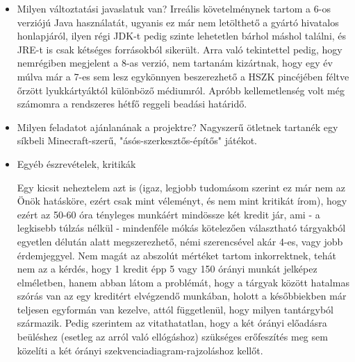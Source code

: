 \begin{itemize}
\item Milyen változtatási javaslatuk van? \newline
Irreális követelménynek tartom a 6-os verziójú Java használatát, ugyanis ez már nem letölthető a gyártó hivatalos honlapjáról, ilyen régi JDK-t pedig szinte lehetetlen bárhol máshol találni, és JRE-t is csak kétséges forrásokból sikerült. Arra való tekintettel pedig, hogy nemrégiben megjelent a 8-as verzió, nem tartanám kizártnak, hogy egy év múlva már a 7-es sem lesz egykönnyen beszerezhető a HSZK pincéjében féltve őrzött lyukkártyáktól különböző médiumról.
Apróbb kellemetlenség volt még számomra a rendszeres hétfő reggeli beadási határidő.

\item Milyen feladatot ajánlanának a projektre? \newline
Nagyszerű ötletnek tartanék egy síkbeli Minecraft-szerű, "ásós-szerkesztős-építős" játékot.

\item Egyéb észrevételek, kritikák

Egy kicsit neheztelem azt is (igaz, legjobb tudomásom szerint ez már nem az Önök hatásköre, ezért csak mint véleményt, és nem mint kritikát írom), hogy ezért az 50-60 óra tényleges munkáért mindössze két kredit jár, ami - a legkisebb túlzás nélkül - mindenféle mókás kötelezően választható tárgyakból egyetlen délután alatt megszerezhető, némi szerencsével akár 4-es, vagy jobb érdemjeggyel. Nem magát az abszolút mértéket tartom inkorrektnek, tehát nem az a kérdés, hogy 1 kredit épp 5 vagy 150 órányi munkát jelképez elméletben, hanem abban látom a problémát, hogy a tárgyak között hatalmas szórás van az egy kreditért elvégzendő munkában, holott a későbbiekben már teljesen egyformán van kezelve, attól függetlenül, hogy milyen tantárgyból származik. Pedig szerintem az vitathatatlan, hogy a két órányi előadásra beüléshez (esetleg az arról való ellógáshoz) szükséges erőfeszítés meg sem közelíti a két órányi szekvenciadiagram-rajzoláshoz kellőt.

\end{itemize}


